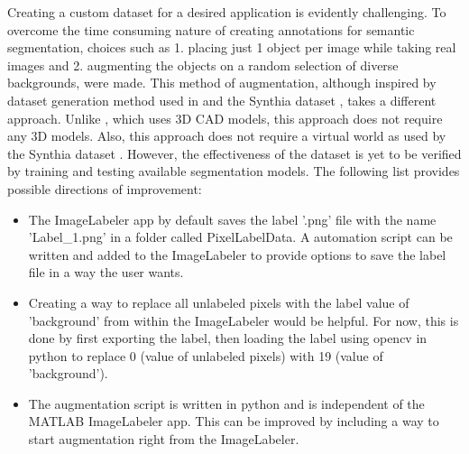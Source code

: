 \documentclass[paper=a4,11pt,parskip=half,toc=listof]{scrartcl}
\begin{document}
Creating a custom dataset for a desired application is evidently challenging. To overcome the time consuming nature of creating annotations for semantic segmentation, choices such as 1. placing just 1 object per image while taking real images and 2. augmenting the objects on a random selection of diverse backgrounds, were made. This method of augmentation, although inspired by dataset generation method used in \cite{DBLP:journals/corr/abs-1709-00849} and the Synthia dataset \cite{RosCVPR16}, takes a different approach. Unlike \cite{DBLP:journals/corr/abs-1709-00849}, which uses 3D CAD models, this approach does not require any 3D models. Also, this approach does not require a virtual world as used by the Synthia dataset \cite{RosCVPR16}. However, the effectiveness of the dataset is yet to be verified by training and testing available segmentation models.
The following list provides possible directions of improvement:
	\begin{itemize}
		\item The ImageLabeler app by default saves the label '.png' file with the name 'Label\_1.png' in a folder called PixelLabelData. A automation script can be written and added to the ImageLabeler to provide options to save the label file in a way the user wants.
		\item Creating a way to replace all unlabeled pixels with the label value of 'background' from within the ImageLabeler would be helpful. For now, this is done by first exporting the label, then loading the label using opencv in python to replace 0 (value of unlabeled pixels) with 19 (value of 'background').
		\item The augmentation script is written in python and is independent of the MATLAB ImageLabeler app. This can be improved by including a way to start augmentation right from the ImageLabeler.
	\end{itemize}

\newpage
{}



\end{document}
